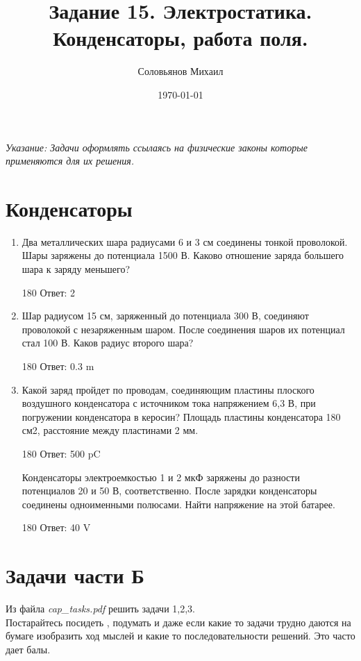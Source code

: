 \documentclass[a4paper,12pt]{article} %
\author{Соловьянов Михаил }
\title{Задание 15. Электростатика.  Конденсаторы, работа поля.}
\date{\today}
\begin{document}
\maketitle



\textit{Указание: Задачи оформлять ссылаясь на физические законы которые применяются для их решения.}




\section{ Конденсаторы }
\begin{enumerate}
	\item	Два металлических шара радиусами 6 и 3 см соединены тонкой проволокой. Шары заряжены до потенциала 1500 В. Каково отношение заряда большего шара к заряду меньшего?\\
	\begin{turn}{180} 
	Ответ: 2 
	\end{turn}


	\item Шар радиусом 15 см, заряженный до потенциала 300 В, соединяют проволокой с незаряженным шаром. После соединения шаров их потенциал стал 100 В. Каков радиус второго шара?

	\begin{turn}{180} 
	Ответ: 0.3 m
	\end{turn}

	 \item Какой заряд пройдет по проводам, соединяющим пластины плоского воздушного конденсатора с источником тока напряжением 6,3 В, при погружении конденсатора в керосин? Площадь пластины конденсатора 180 см2, расстояние между пластинами 2 мм.

	\begin{turn}{180} 
	Ответ: 500 pC
	\end{turn}

	\ietm Конденсаторы электроемкостью 1 и 2 мкФ заряжены до разности потенциалов 20 и 50 В, соответственно. После зарядки конденсаторы соединены одноименными полюсами. Найти напряжение на этой батарее.

	\begin{turn}{180} 
	Ответ: 40 V
	\end{turn}

\end{enumerate}


\section{Задачи части Б}

Из файла \textit{cap\_tasks.pdf} решить задачи 1,2,3. \\

Постарайтесь посидеть ,  подумать и даже если какие то задачи трудно даются на бумаге изобразить ход мыслей и какие то последовательности решений. Это часто дает балы.
\end{document}
